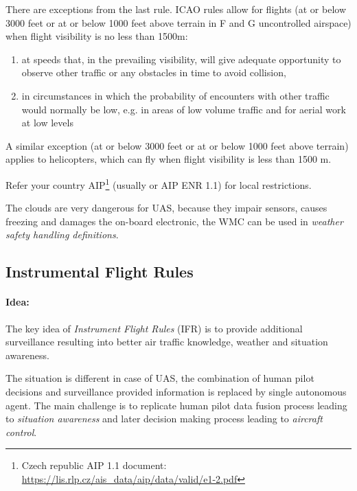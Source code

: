 \noindent There are exceptions from the last rule. ICAO rules allow for flights (at or below 3000 feet or at or below 1000 feet above terrain in F and G uncontrolled airspace) when flight visibility is no less than 1500m:
\begin{enumerate}
    \item at speeds that, in the prevailing visibility, will give adequate opportunity to observe other traffic or any obstacles in time to avoid collision,
    
    \item in circumstances in which the probability of encounters with other traffic would normally be low, e.g. in areas of low volume traffic and for aerial work at low levels
\end{enumerate}

\noindent A similar exception (at or below 3000 feet or at or below 1000 feet above terrain) applies to helicopters, which can fly when flight visibility is less than 1500 m.

Refer your country AIP\footnote{Czech republic AIP 1.1 document: \url{https://lis.rlp.cz/ais_data/aip/data/valid/e1-2.pdf}} (usually  or AIP ENR 1.1) for local restrictions.

\begin{note}
    The clouds are very dangerous for UAS, because they impair sensors, causes freezing and damages the on-board electronic, the WMC can be used in \emph{weather safety handling definitions}.
\end{note}

\subsection{Instrumental Flight Rules}\label{sec:InstrumentalFlightRules}
\paragraph{Idea:} The key idea of \emph{Instrument Flight Rules} (IFR) is to provide additional surveillance resulting into better air traffic knowledge, weather and situation awareness. 

The situation is different in case of UAS, the combination of human pilot decisions and surveillance provided information is replaced by single autonomous agent. The main challenge is to replicate human pilot data fusion process leading to \emph{situation awareness} and later decision making process leading to \emph{aircraft control}.


